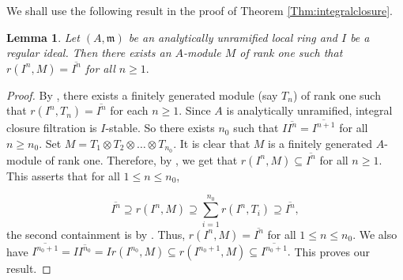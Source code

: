 \documentclass[11pt]{amsart}
\theoremstyle{plain}
\newtheorem{lemma}[theorem]{Lemma}
\newcommand{\m}{\mathfrak{m}}
\theoremstyle{plain}
\begin{document}
 We shall use the following result in the proof of Theorem \ref{Thm:integralclosure}.

\begin{lemma}
\label{Thm:closure}
    Let $(A,\m)$ be an analytically unramified local ring and $I$ be a regular ideal. Then there exists an $A$-module $M$ of rank one such that $r(I^n,M)=\overline{I^n}$ for all $n\geq 1.$
\end{lemma}
\begin{proof}
    By \cite[Theorem 4.4]{Zulfeqarr}, there exists a finitely generated module (say $T_n$) of rank one such that $r(I^n, T_n)=\overline{I^n}$ for each $n\geq 1.$ Since $A$ is analytically unramified, integral closure filtration is $I$-stable. So there exists $n_0$ such that $I\overline{I^n}=\overline{I^{n+1}}$ for all $n\geq n_0.$ Set $M=T_1\otimes T_2\otimes \ldots \otimes T_{n_{0}}.$ It is clear that $M$ is a finitely generated $A$-module of rank one. Therefore, by \cite[Proposition 4.2]{Zulfeqarr},  we get that $r(I^n,M)\subseteq \overline{I^n}$ for all $n\geq 1.$ This asserts that for all $1\leq n\leq n_0$,

    $$\overline{I^n}\supseteq r(I^n,M)\supseteq \sum_{i=1}^{n_0}r(I^n,T_i)\supseteq \overline{I^n},$$
    the second containment is by \cite[Proposition 1.4(c)]{Zulfeqarr}. Thus, $r(I^n,M)=\overline{I^n}$ for all $1\leq n\leq n_0.$ We also have  $\overline{I^{n_0+1}}=I\overline{I^{n_0}}=Ir(I^{n_0},M)\subseteq r(I^{n_0+1},M)\subseteq \overline{I^{n_0+1}}.$ This proves our result.
\end{proof}
\end{document}
